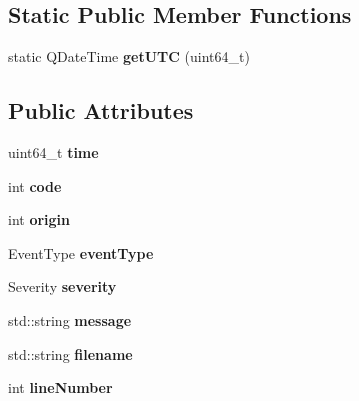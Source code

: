 \subsection*{Static Public Member Functions}
\begin{DoxyCompactItemize}
\item 
static Q\+Date\+Time {\bfseries get\+U\+TC} (uint64\+\_\+t)\hypertarget{class_b_c___event_a3fc59df9986ed204e38c5ecb5cbf3a11}{}\label{class_b_c___event_a3fc59df9986ed204e38c5ecb5cbf3a11}

\end{DoxyCompactItemize}
\subsection*{Public Attributes}
\begin{DoxyCompactItemize}
\item 
uint64\+\_\+t {\bfseries time}\hypertarget{class_b_c___event_acd269f4dbdbdb27d4994998b6c669559}{}\label{class_b_c___event_acd269f4dbdbdb27d4994998b6c669559}

\item 
int {\bfseries code}\hypertarget{class_b_c___event_ac6686c20f280941419bf8c6fc9d7cb44}{}\label{class_b_c___event_ac6686c20f280941419bf8c6fc9d7cb44}

\item 
int {\bfseries origin}\hypertarget{class_b_c___event_a4a67d0557454551f825a01fa77872db7}{}\label{class_b_c___event_a4a67d0557454551f825a01fa77872db7}

\item 
Event\+Type {\bfseries event\+Type}\hypertarget{class_b_c___event_a7fb69f25ec2f6fa377d680d140c61d99}{}\label{class_b_c___event_a7fb69f25ec2f6fa377d680d140c61d99}

\item 
Severity {\bfseries severity}\hypertarget{class_b_c___event_a8ea390d80d78ac9800b929611fcbff20}{}\label{class_b_c___event_a8ea390d80d78ac9800b929611fcbff20}

\item 
std\+::string {\bfseries message}\hypertarget{class_b_c___event_aff93fcb88a819232bd85f4328939b9a9}{}\label{class_b_c___event_aff93fcb88a819232bd85f4328939b9a9}

\item 
std\+::string {\bfseries filename}\hypertarget{class_b_c___event_aae5aeacf68d313f8c0473510a5eb9388}{}\label{class_b_c___event_aae5aeacf68d313f8c0473510a5eb9388}

\item 
int {\bfseries line\+Number}\hypertarget{class_b_c___event_ace00f024ebc3e5e00f9472768c84a563}{}\label{class_b_c___event_ace00f024ebc3e5e00f9472768c84a563}

\end{DoxyCompactItemize}


